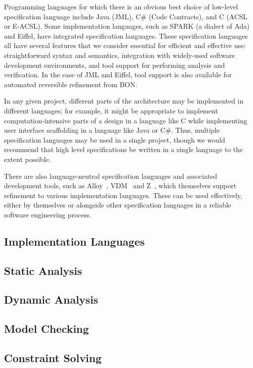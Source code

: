 Programming languages for which there is an obvious best choice of
low-level specification language include Java (JML), C\# (Code
Contracts), and C (ACSL or E-ACSL). Some implementation languages,
such as SPARK (a dialect of Ada)~\cite{SPARK2014} and Eiffel, have
integrated specification languages. These specification languages all
have several features that we consider essential for efficient and
effective use: straightforward syntax and semantics, integration with
widely-used software development environments, and tool support for
performing analysis and verification. In the case of JML and Eiffel,
tool support is also available for automated reversible refinement
from BON.

In any given project, different parts of the architecture may be
implemented in different languages; for example, it might be
appropriate to implement computation-intensive parts of a design in a
language like C while implementing user interface scaffolding in a
language like Java or C\#. Thus, multiple specification languages may
be used in a single project, though we would recommend that 
high level specifications be written in a single language to the
extent possible.

There are also language-neutral specification languages and associated
development tools, such as Alloy~\cite{Alloy}, VDM~\cite{VDM} and
Z~\cite{Zed}, which themselves support refinement to various
implementation languages. These can be used effectively, either by
themselves or alongside other specification languages in a reliable
software engineering process.

\subsection{Implementation Languages}

\subsection{Static Analysis}

\subsection{Dynamic Analysis}

\subsection{Model Checking}

\subsection{Constraint Solving}

